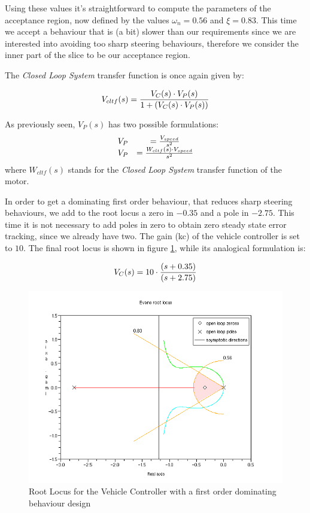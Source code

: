 Using these values it's straightforward to compute the parameters of the acceptance region, now defined by the values $\omega_n = 0.56$ and $\xi = 0.83$. This time we accept a behaviour that is (a bit) slower than our requirements since we are interested into avoiding too sharp steering behaviours, therefore we consider the inner part of the slice to be our acceptance region.

The \textit{Closed Loop System} transfer function is once again given by:

\[
V_{cltf}(s) = {{V_C(s) \cdot V_P(s)} \over {1 + {( V_C(s) \cdot V_P(s) )}}}
\]

As previously seen, $V_P(s)$ has two possible formulations:
\[
\begin{array}{lcl}
V_{P} &= {{V_{speed}} \over {s^2}} \\
V_{P} &= {W_{cltf}(s)\cdot{}{V_{speed}} \over {s^2}} \\
\end{array}
\]
where $W_{cltf}(s)$ stands for the \textit{Closed Loop System} transfer function of the motor.

In order to get a dominating first order behaviour, that reduces sharp steering behaviours, we add to the root locus a zero in $-0.35$ and a pole in $-2.75$. This time it is not necessary to add poles in zero to obtain zero steady state error tracking, since we already have two. The gain (kc) of the vehicle controller is set to $10$. The final root locus is shown in figure \ref{fig:rlVehicle}, while its analogical formulation is:

\[
		V_C(s) =10\cdot{} {{(s + 0.35)} \over {(s+2.75)}}
\]

\begin{figure}[H]
  \begin{center}
  \includegraphics[scale=0.51]{FIGURES_3/VehicleRootLocus01.png}
    \caption[]{Root Locus for the Vehicle Controller with a first order dominating behaviour design}
    \label{fig:rlVehicle}
  \end{center}
\end{figure}

